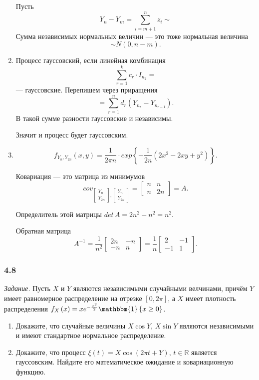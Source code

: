 \begin{enumerate}[label=\alph*)]
  Пусть
  $$Y_n - Y_m =
    \sum \limits_{i = m + 1}^n z_i \sim $$
  Сумма независимых нормальных величин --- это тоже нормальная величина
  $$ \sim N \left( 0, n - m \right).$$
  \item Процесс гауссовский, если линейная комбинация
  $$ \sum \limits_{r = 1}^k c_r \cdot I_{n_k} =$$
  --- гауссовские.
  Перепишем через приращения
  $$= \sum \limits_{r = 1}^n d_r \left( Y_{n_r} - Y_{n_{r - 1}} \right).$$
  В такой сумме разности гауссовские и независимы.

  Значит и процесс будет гауссовским.
  \item $$f_{Y_n, Y_{2n}} \left( x, y \right) =
    \frac{1}{2 \pi n} \cdot exp \left\{ -\frac{1}{2n} \left( 2x^2 - 2xy + y^2 \right) \right\}.$$

  Ковариация --- это матрица из минимумов
  $$cov_{\begin{bmatrix} Y_n \\ Y_{2n} \end{bmatrix}, \begin{bmatrix} Y_n \\ Y_{2n} \end{bmatrix}} =
    \begin{bmatrix}
      n & n \\
      n & 2n
    \end{bmatrix} =
    A.$$

  Определитель этой матрицы $det \, A = 2n^2 - n^2 = n^2$.

  Обратная матрица
  $$A^{-1} =
    \frac{1}{n^2}
    \begin{bmatrix}
      2n & -n \\
      -n & n
    \end{bmatrix} =
    \frac{1}{n}
    \begin{bmatrix}
      2 & -1 \\
      -1 & 1
    \end{bmatrix}.$$
\end{enumerate}

\subsubsection*{4.8}

\textit{Задание.}
Пусть $X$ и $Y$ являются независимыми случайными велчинами,
причём $Y$ имеет равномерное распределение на отрезке $ \left[ 0, 2 \pi \right] $,
а $X$ имеет плотность распределения
$f_X \left( x \right) =
  xe^{-\frac{x^2}{2}} \mathbbm{1} \left\{ x \geq 0 \right\} $.
\begin{enumerate}[label=\alph*)]
  \item Докажите, что случайные величины $X \cos Y, \, X \sin Y$
  являются независимыми и имеют стандартное нормальное распределение.
  \item Докажите, что процесс
  $ \xi \left( t \right) = X \cos \left( 2 \pi t + Y \right), \,
    t \in \mathbb{R}$
  является гауссовским.
  Найдите его математическое ожидание и ковариационную функцию.
\end{enumerate}

